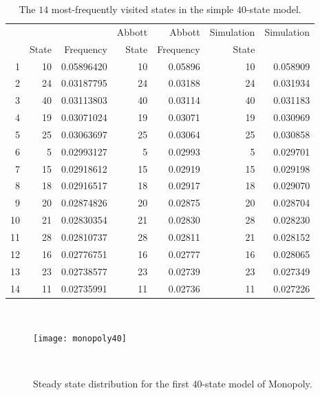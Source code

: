 \documentclass[12pt]{article}
\begin{document}
\begin{table}
    \centering
    \begin{tabular}{rrrrrrr}
           &       &            & Abbott & Abbott    & Simulation & Simulation \\ 
           & State & Frequency  & State  & Frequency & State      &            \\ 
        1  & 10    & 0.05896420 & 10     & 0.05896   & 10         & 0.058909   \\ 
        2  & 24    & 0.03187795 & 24     & 0.03188   & 24         & 0.031934   \\ 
        3  & 40    & 0.03113803 & 40     & 0.03114   & 40         & 0.031183   \\ 
        4  & 19    & 0.03071024 & 19     & 0.03071   & 19         & 0.030969   \\ 
        5  & 25    & 0.03063697 & 25     & 0.03064   & 25         & 0.030858   \\ 
        6  & 5     & 0.02993127 & 5      & 0.02993   & 5          & 0.029701   \\ 
        7  & 15    & 0.02918612 & 15     & 0.02919   & 15         & 0.029198   \\ 
        8  & 18    & 0.02916517 & 18     & 0.02917   & 18         & 0.029070   \\ 
        9  & 20    & 0.02874826 & 20     & 0.02875   & 20         & 0.028704   \\ 
        10 & 21    & 0.02830354 & 21     & 0.02830   & 28         & 0.028230   \\ 
        11 & 28    & 0.02810737 & 28     & 0.02811   & 21         & 0.028152   \\ 
        12 & 16    & 0.02776751 & 16     & 0.02777   & 16         & 0.028065   \\ 
        13 & 23    & 0.02738577 & 23     & 0.02739   & 23         & 0.027349   \\ 
        14 & 11    & 0.02735991 & 11     & 0.02736   & 11         & 0.027226   \\ 
    \end{tabular}
    \caption{The $ 14 $ most-frequently visited states in the simple
    $ 40 $-state model.}~%
    \label{tab:monopoly:freq40}
\end{table}

\begin{figure}
    \centering
    \texttt{[image: monopoly40]}
    \caption{Steady state distribution for the first $ 40 $-state
    model of Monopoly.}~%
    \label{fig:monopoly:monopoly40}
\end{figure}
\end{document}
